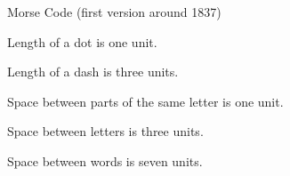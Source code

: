 
\begin{frame}{Morse Code (first version around 1837)}
  \begin{center}
  \end{center}
\bit
\item Length of a dot is one unit.
\item Length of a dash is three units.
\item Space between parts of the same letter is one unit.
\item Space between letters is three units.
\item Space between words is seven units.
\eit
\end{frame}
